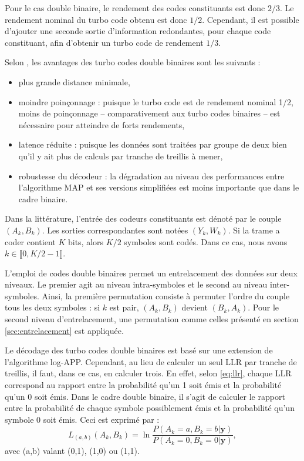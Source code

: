 Pour le cas double binaire, le rendement des codes constituants est donc $2/3$. Le rendement nominal du turbo code obtenu est donc $1/2$. Cependant, il est possible d'ajouter une seconde sortie  d'information redondantes, pour chaque code constituant, afin d'obtenir un turbo code de rendement $1/3$. 

Selon \cite{doublebinadvantages}, les avantages des turbo codes double binaires sont les suivants : 
\begin{itemize}
	\item plus grande distance minimale,
	\item moindre poinçonnage : puisque le turbo code est de rendement nominal 1/2, moins de poinçonnage -- comparativement aux turbo codes binaires -- est nécessaire pour atteindre de forts rendements,
	\item latence réduite : puisque les données sont traitées par groupe de deux bien qu'il y ait plus de calculs par tranche de treillis à mener,
	\item robustesse du décodeur : la dégradation au niveau des performances entre l'algorithme MAP et ses versions simplifiées est moins importante que dans le cadre binaire.
\end{itemize}

Dans la littérature, l'entrée des codeurs constituants est dénoté par le couple $(A_k,B_k)$. Les sorties correspondantes sont notées $(Y_k,W_k)$. Si la trame a coder contient $K$ bits, alors $K/2$ symboles sont codés. Dans ce cas, nous avons $k \in \llbracket 0, K/2-1\rrbracket$.

L'emploi de codes double binaires permet un entrelacement des données sur deux niveaux. Le premier agit au niveau intra-symboles et le second au niveau inter-symboles. Ainsi, la première permutation consiste à permuter l'ordre du couple tous les deux symboles : si $k$ est pair, $(A_k,B_k)$ devient $(B_k,A_k)$. Pour le second niveau d'entrelacement, une permutation comme celles présenté en section \ref{sec:entrelacement} est appliquée.

Le décodage des turbo codes double binaires est basé sur une extension de l'algorithme log-APP. Cependant, au lieu de calculer un seul LLR par tranche de treillis, il faut, dans ce cas, en calculer trois. En effet, selon \ref{eq:llr}, chaque LLR correspond au rapport entre la probabilité qu'un 1 soit émis et la probabilité qu'un 0 soit émis. Dans le cadre double binaire, il s'agit de calculer le rapport entre la probabilité de chaque symbole possiblement émis et la probabilité qu'un symbole 0 soit émis. Ceci est exprimé par : 
\begin{equation*}
	L_{(a,b)}(A_k,B_k) = \ln\frac{P(A_k=a,B_k=b|\mathbf{y})}{P(A_k=0,B_k=0|\mathbf{y})},
\end{equation*}
avec (a,b) valant (0,1), (1,0) ou (1,1).

